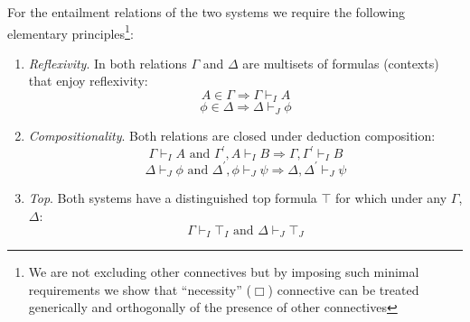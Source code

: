 For the  entailment relations of the two systems we require the following elementary principles\footnote{We are not excluding other connectives but by imposing
such minimal requirements we show that ``necessity'' ($\Box$) connective can be treated generically and orthogonally of the presence of other connectives}:
\begin{enumerate}
	\item \textit{Reflexivity}. In both relations $\Gamma$ and $\Delta$ are multisets of formulas (contexts) that enjoy reflexivity:
	$$A \in \Gamma \Longrightarrow \Gamma\vdash_{I}A$$ $$\phi \in \Delta \Longrightarrow \Delta\vdash_{J}\phi$$
	\item \textit{Compositionality}.  Both relations are closed under deduction composition:  
	$$\Gamma\vdash_I A \text{\ and\ } \Gamma^{'},A\vdash_{I} B \Longrightarrow \Gamma,\Gamma^{'}\vdash_I B $$  
	$$\Delta\vdash_J\phi \text{\ and\ } \Delta^{'},\phi\vdash_{J} \psi \Longrightarrow \Delta,\Delta^{'}\vdash_J \psi$$ 
	\item \textit{Top}. Both systems have a distinguished top formula $\top$ for which under any $\Gamma$, $\Delta$: $$\Gamma\vdash_{I}\top_I \text{\ and \ }
	\Delta \vdash_J\top_J$$
\end{enumerate}

